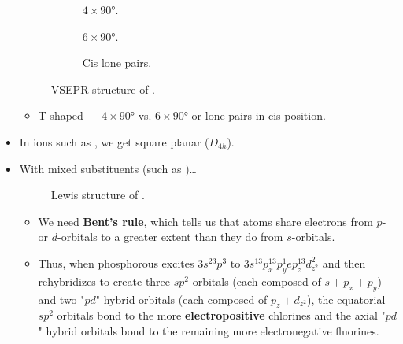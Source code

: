 \documentclass[../main.tex]{subfiles}
\begin{document}
\begin{itemize}
\begin{figure}[h!]
\begin{subfigure}[b]{0.2\linewidth}
            \centering
            \caption{$4\times\ang{90}$.}
            \label{fig:VSEPR-BrF3a}
        \end{subfigure}
        \begin{subfigure}[b]{0.2\linewidth}
            \centering
            \caption{$6\times\ang{90}$.}
            \label{fig:VSEPR-BrF3b}
        \end{subfigure}
        \begin{subfigure}[b]{0.2\linewidth}
            \centering
            \caption{Cis lone pairs.}
            \label{fig:VSEPR-BrF3c}
        \end{subfigure}
        \caption{VSEPR structure of .}
        \label{fig:VSEPR-BrF3}
    \end{figure}
    \begin{itemize}
        \item T-shaped --- $4\times\ang{90}$ vs. $6\times\ang{90}$ or lone pairs in cis-position.
    \end{itemize}
    \item In ions such as , we get square planar ($D_{4h}$).
    \item With mixed substituents (such as )\dots
    \begin{figure}[h!]
        \centering
        \caption{Lewis structure of .}
        \label{fig:Lewis-PF2Cl3}
    \end{figure}
    \begin{itemize}
        \item We need \textbf{Bent's rule}, which tells us that atoms share electrons from $p$- or $d$-orbitals to a greater extent than they do from $s$-orbitals.
        \item Thus, when phosphorous excites $3s^23p^3$ to $3s^13p_x^13p_y^1ep_z^13d_{z^2}^2$ and then rehybridizes to create three $sp^2$ orbitals (each composed of $s+p_x+p_y$) and two "$pd$" hybrid orbitals (each composed of $p_z+d_{z^2}$), the equatorial $sp^2$ orbitals bond to the more \textbf{electropositive} chlorines and the axial "$pd$" hybrid orbitals bond to the remaining more electronegative fluorines.
    \end{itemize}

\end{itemize}
\end{document}
